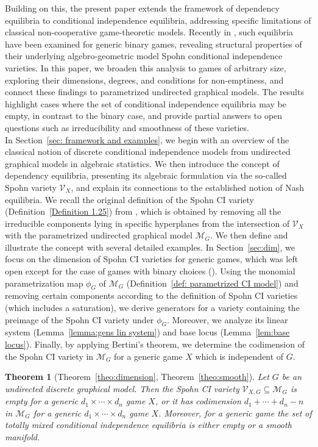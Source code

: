 \documentclass[11pt]{amsart}
\numberwithin{equation}{section}
\theoremstyle{plain}
\newtheorem{theorem}{Theorem}
\numberwithin{theorem}{section}
\theoremstyle{definition}
\begin{document}
Building on this, the present paper extends the framework of dependency equilibria to conditional independence equilibria, addressing specific limitations of classical non-cooperative game-theoretic models.
Recently in \cite{portakal2024nash,portakal2024game}, such equilibria have been examined for generic binary games, revealing structural properties of their underlying algebro-geometric model Spohn conditional independence varieties. In this paper, we broaden this analysis to games of arbitrary size, exploring their dimensions, degrees, and conditions for non-emptiness, and connect these findings to parametrized undirected graphical models. The results highlight cases where the set of conditional independence equilibria may be empty, in contrast to the binary case, and provide partial answers to open questions such as irreducibility and smoothness of these varieties.\\
\indent In Section~\ref{sec: framework and examples}, we begin with an overview of the classical notion of discrete conditional independence models from undirected graphical models in algebraic statistics. We then introduce the concept of dependency equilibria, presenting its algebraic formulation via the so-called Spohn variety $\mathcal V_X$, and explain its connections to the established notion of Nash equilibria. We recall the original definition of the Spohn CI variety (Definition~\ref{Definition 1.25}) from \cite{portakal2022geometry}, which is obtained by removing all the irreducible components lying in specific hyperplanes from the intersection of $\mathcal V_X$ with the parametrized undirected graphical model $\mathcal M_G$. We then define and illustrate the concept with several detailed examples. In Section~\ref{sec:dim}, we focus on the dimension of Spohn CI varieties for generic games, which was left open except for the case of games with binary choices (\cite[Theorem 9]{portakal2024game}).  Using the monomial parametrization map $\phi_G$ of $\mathcal{M}_G$ (Definition~\ref{def: parametrized CI model}) and removing certain components according to the definition of Spohn CI varieties (which includes a saturation), we derive generators for a variety containing the preimage of the Spohn CI variety under $\phi_G$. Moreover, we analyze its linear system (Lemma~\ref{lemma:gens lin system}) and base locus (Lemma~\ref{lem:base locus}). Finally, by applying Bertini's theorem, we determine the codimension of the Spohn CI variety in $\mathcal{M}_G$ for a generic game $X$ which is independent of $G$.

\begin{theorem}[Theorem~\ref{theo:dimension}, Theorem~\ref{theo:smooth}]
Let $G$ be an undirected discrete graphical model. Then the Spohn CI variety $\mathcal{V}_{X,G} \subseteq \mathcal M_G$ is empty for a generic $d_1 \times \cdots \times d_n$ game $X$, or it has codimension $d_1 + \cdots + d_n - n$ in $\mathcal M_G$ for a generic $d_1 \times \cdots \times d_n$ game $X$. Moreover, for a generic game the set of totally mixed conditional independence equilibria is either empty or a smooth manifold.
\end{theorem}
\end{document}
